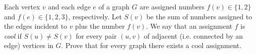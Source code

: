 Each vertex $v$ and each edge $e$ of a graph $G$ are assigned numbers $f(v)\in\{1,2\}$ and $f(e)\in\{1,2,3\}$, respectively.
Let $S(v)$ be the sum of numbers assigned to the edges incident to $v$ plus the number $f(v)$.
We say that an assignment $f$ is \emph{cool} if  $S(u) \ne S(v)$ for every pair $(u,v)$ of adjacent (i.e. connected by an edge) vertices in $G$.
Prove that for every graph there exists a cool assignment.